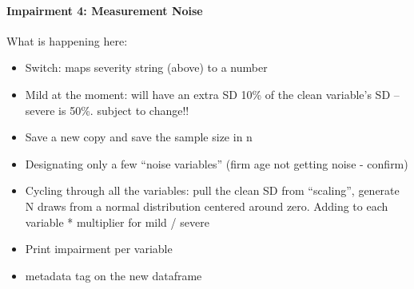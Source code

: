 \documentclass[
]{article}
\providecommand{\tightlist}{%
  \setlength{\itemsep}{0pt}\setlength{\parskip}{0pt}}
\begin{document}
\paragraph{\texorpdfstring{\textbf{Impairment 4: Measurement
Noise}}{Impairment 4: Measurement Noise}}\label{impairment-4-measurement-noise}

What is happening here:

\begin{itemize}
\tightlist
\item
  Switch: maps severity string (above) to a number
\item
  Mild at the moment: will have an extra SD 10\% of the clean variable's
  SD -- severe is 50\%. subject to change!!
\item
  Save a new copy and save the sample size in n
\item
  Designating only a few ``noise variables'' (firm age not getting noise
  - confirm)
\item
  Cycling through all the variables: pull the clean SD from ``scaling'',
  generate N draws from a normal distribution centered around zero.
  Adding to each variable * multiplier for mild / severe
\item
  Print impairment per variable
\item
  metadata tag on the new dataframe
\end{itemize}
\end{document}
